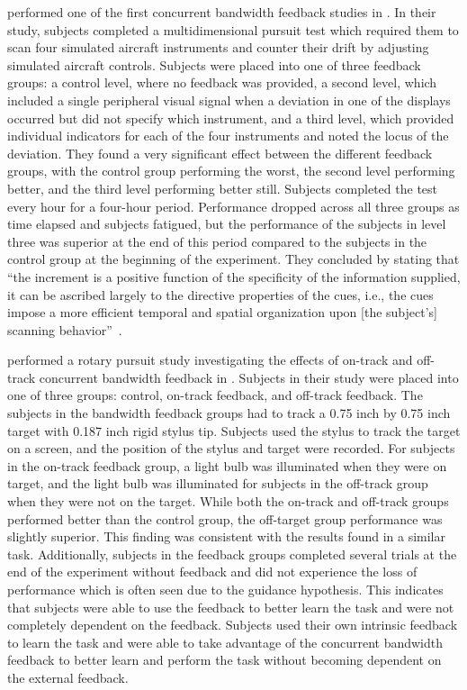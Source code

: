 \citeauthor{payne_effect_1955} performed one of the first concurrent bandwidth feedback studies in \citeyear{payne_effect_1955}.
In their study, subjects completed a multidimensional pursuit test which required them to scan four simulated aircraft instruments and counter their drift by adjusting simulated aircraft controls.
Subjects were placed into one of three feedback groups: a control level, where no feedback was provided, a second level, which included a single peripheral visual signal when a deviation in one of the displays occurred but did not specify which instrument, and a third level, which provided individual indicators for each of the four instruments and noted the locus of the deviation.
They found a very significant effect between the different feedback groups, with the control group performing the worst, the second level performing better, and the third level performing better still.
Subjects completed the test every hour for a four-hour period.
Performance dropped across all three groups as time elapsed and subjects fatigued, but the performance of the subjects in level three was superior at the end of this period compared to the subjects in the control group at the beginning of the experiment.
They concluded by stating that ``the increment is a positive function of the specificity of the information supplied, it can be ascribed largely to the directive properties of the cues, i.e., the cues impose a more efficient temporal and spatial organization upon [the subject's] scanning behavior''~\citep{payne_effect_1955}.

\citeauthor{gordon_effect_1967} performed a rotary pursuit study investigating the effects of on-track and off-track concurrent bandwidth feedback in \citeyear{gordon_effect_1967}.
Subjects in their study were placed into one of three groups: control, on-track feedback, and off-track feedback.
The subjects in the bandwidth feedback groups had to track a 0.75 inch by 0.75 inch target with 0.187 inch rigid stylus tip.
Subjects used the stylus to track the target on a screen, and the position of the stylus and target were recorded.
For subjects in the on-track feedback group, a light bulb was illuminated when they were on target, and the light bulb was illuminated for subjects in the off-track group when they were not on the target.
While both the on-track and off-track groups performed better than the control group, the off-target group performance was slightly superior.
This finding was consistent with the results \citeauthor{williams_-target_1962} found in a similar task.
Additionally, subjects in the feedback groups completed several trials at the end of the experiment without feedback and did not experience the loss of performance which is often seen due to the guidance hypothesis.
This indicates that subjects were able to use the feedback to better learn the task and were not completely dependent on the feedback.
Subjects used their own intrinsic feedback to learn the task and were able to take advantage of the concurrent bandwidth feedback to better learn and perform the task without becoming dependent on the external feedback.

